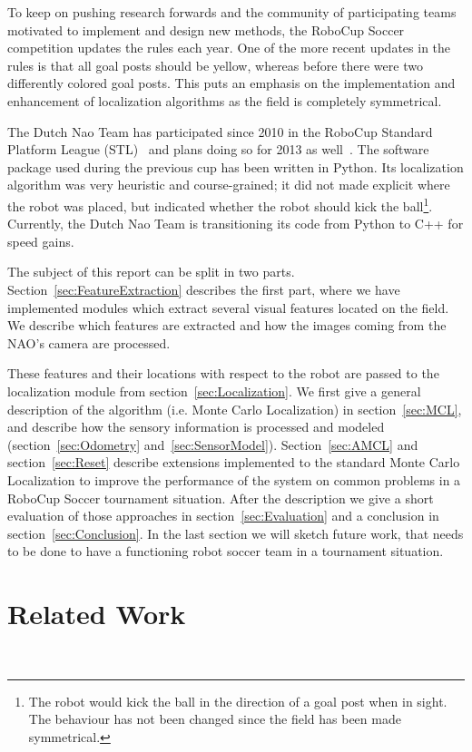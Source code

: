 \documentclass[	DIV=calc,%
							paper=a4,%
							fontsize=9pt,%
							twocolumn]{scrartcl}	 					%
\begin{document}
To keep on pushing research forwards and the community of participating teams motivated to implement and design new methods, the RoboCup Soccer competition updates the rules each year.  One of the more recent updates in the rules is that all goal posts should be yellow, whereas before there were two differently colored goal posts.  This puts an emphasis on the implementation and enhancement of localization algorithms as the field is completely symmetrical.

The Dutch Nao Team has participated since 2010 in the RoboCup Standard Platform League (STL)~\cite{DNT-TD10, DNT-TD11, DNT-TD12} and plans doing so for 2013 as well~\cite{DNT-TD13}.  The software package used during the previous cup has been written in Python.  Its localization algorithm was very heuristic and course-grained; it did not made explicit where the robot was placed, but indicated whether the robot should kick the ball\footnote{The robot would kick the ball in the direction of a goal post when in sight. The behaviour has not been changed since the field has been made symmetrical.}.  Currently, the Dutch Nao Team is transitioning its code from Python to C++ for speed gains. 

The subject of this report can be split in two parts. Section~\ref{sec:FeatureExtraction} describes the first part, where we have implemented modules which extract several visual features located on the field.  We describe which features are extracted and how the images coming from the NAO's camera are processed. 

These features and their locations with respect to the robot are passed to the localization module from section~\ref{sec:Localization}.  We first give a general description of the algorithm (i.e. Monte Carlo Localization) in section~\ref{sec:MCL}, and describe how the sensory information is processed and modeled (section~\ref{sec:Odometry} and~\ref{sec:SensorModel}). Section~\ref{sec:AMCL} and section~\ref{sec:Reset} describe extensions implemented to the standard Monte Carlo Localization to improve the performance of the system on common problems in a RoboCup Soccer tournament situation. 
After the description we give a short evaluation of those approaches in section~\ref{sec:Evaluation} and a conclusion in section~\ref{sec:Conclusion}. In the last section we will sketch future work, that needs to be done to have a functioning robot soccer team in a tournament situation.

\section{Related Work}
~\cite{canas2009visual}
~\cite{ashar2010robocup}
~\cite{canas2010recognition}
~\cite{schulz2012utilizing}
~\cite{deng2011natural}
\end{document}
